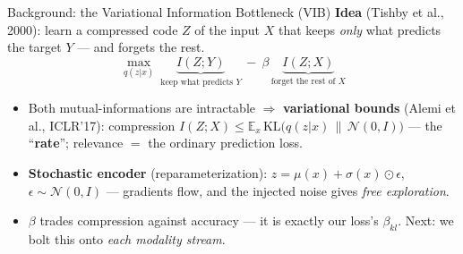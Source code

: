 \documentclass[aspectratio=169,11pt]{beamer}
\begin{document}

\begin{frame}{Background: the Variational Information Bottleneck (VIB)}
{\small \textbf{Idea} (Tishby et al., 2000): learn a compressed code $Z$ of the input $X$ that keeps
\emph{only} what predicts the target $Y$ --- and forgets the rest.}
\vspace{-0.2em}
\[
\max_{q(z|x)}\ \underbrace{I(Z;Y)}_{\text{keep what predicts }Y}\ -\ \beta\,\underbrace{I(Z;X)}_{\text{forget the rest of }X}
\]
\vspace{-0.5em}
\centering
{}
\vspace{0.1em}
\begin{itemize}\small
\item Both mutual-informations are intractable $\Rightarrow$ \textbf{variational bounds} (Alemi et al.,
ICLR'17): compression $I(Z;X)\le \mathbb E_x\,\mathrm{KL}\!\big(q(z|x)\,\|\,\mathcal N(0,I)\big)$ ---
the ``\textbf{rate}''; relevance $=$ the ordinary prediction loss.
\item \textbf{Stochastic encoder} (reparameterization): $z=\mu(x)+\sigma(x)\odot\epsilon$,
$\epsilon\sim\mathcal N(0,I)$ --- gradients flow, and the injected noise gives \emph{free exploration}.
\item $\beta$ trades compression against accuracy --- it is exactly our loss's $\beta_{kl}$. Next: we
bolt this onto \emph{each modality stream}.
\end{itemize}
\end{frame}
\end{document}
